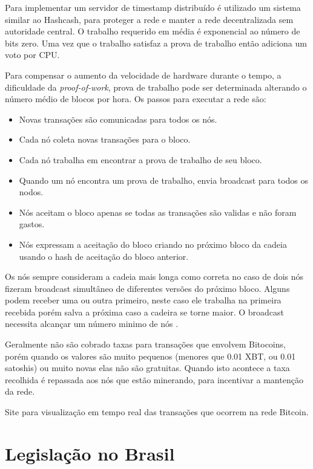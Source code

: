\documentclass[a4paper,11pt]{article}
\theoremstyle{mytheor}
\begin{document}
Para implementar um servidor de timestamp distribuído é utilizado um sistema similar ao Hashcash, para proteger a rede e manter a rede decentralizada sem autoridade central. O trabalho requerido em média é exponencial ao número de bits zero. Uma vez que o trabalho satisfaz a prova de trabalho então adiciona um voto por CPU.

Para compensar o aumento da velocidade de hardware durante o tempo, a dificuldade da \textit{proof-of-work}, prova de trabalho pode ser determinada alterando o número médio de blocos por hora. Os passos para executar a rede são:
\begin{itemize}
    \item Novas transações são comunicadas para todos os nós.
    \item Cada nó coleta novas transações para o bloco.
    \item Cada nó trabalha em encontrar a prova de trabalho de seu bloco.
    \item Quando um nó encontra um prova de trabalho, envia broadcast para todos os nodos.
    \item Nós aceitam o bloco apenas se todas as transações são validas e não foram gastos.
    \item Nós expressam a aceitação do bloco criando no próximo bloco da cadeia usando o hash de aceitação do bloco anterior.
\end{itemize}

Os nós sempre consideram a cadeia mais longa como correta no caso de dois nós fizeram broadcast simultâneo de diferentes versões do próximo bloco. Alguns podem receber uma ou outra primeiro, neste caso ele trabalha na primeira recebida porém salva a próxima caso a cadeira se torne maior. O broadcast necessita alcançar um número minimo de nós \cite{nakamoto2008bitcoin}.

Geralmente não são cobrado taxas para transações que envolvem Bitocoins, porém quando os valores são muito pequenos (menores que 0.01 XBT, ou 0.01 satoshis) ou muito novas elas não são gratuitas. Quando isto acontece a taxa recolhida é repassada aos nós que estão minerando, para incentivar a mantenção da rede.

Site para visualização em tempo real das transações que ocorrem \cite{realTime} na rede Bitcoin.

\section*{Legislação no Brasil}
\end{document}
